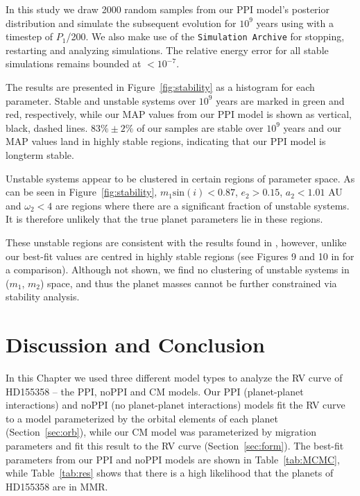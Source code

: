 In this study we draw 2000 random samples from our PPI model's posterior distribution and simulate the subsequent evolution for $10^9$ years using \whfast with a timestep of $P_1$/200. 
We also make use of the {\tt Simulation Archive} \citep{Rein2017} for stopping, restarting and analyzing simulations. 
The relative energy error for all stable simulations remains bounded at $< 10^{-7}$.

The results are presented in Figure~\ref{fig:stability} as a histogram for each parameter.
Stable and unstable systems over $10^9$ years are marked in green and red, respectively, while our MAP values from our PPI model is shown as vertical, black, dashed lines. 
$83\% \pm 2\%$ of our samples are stable over $10^9$ years and our MAP values land in highly stable regions, indicating that our PPI model is longterm stable. 

Unstable systems appear to be clustered in certain regions of parameter space.
As can be seen in Figure~\ref{fig:stability}, $m_1\textrm{sin}(i)<0.87$, $e_2>0.15$, $a_2<1.01$ AU and $\omega_2<4$ are regions where there are a significant fraction of unstable systems.
It is therefore unlikely that the true planet parameters lie in these regions. 

These unstable regions are consistent with the results found in \R, however, unlike \R our best-fit values are centred in highly stable regions (see Figures 9 and 10 in \R for a comparison). 
Although not shown, we find no clustering of unstable systems in ($m_1$, $m_2$) space, and thus the planet masses cannot be further constrained via stability analysis.  

\section{Discussion and Conclusion}
\label{sec:conc}
In this Chapter we used three different model types to analyze the RV curve of HD155358 -- the PPI, noPPI and CM models. 
Our PPI (planet-planet interactions) and noPPI (no planet-planet interactions) models fit the RV curve to a model parameterized by the orbital elements of each planet (Section~\ref{sec:orb}), while our CM model was parameterized by migration parameters and fit this result to the RV curve (Section~\ref{sec:form}).
The best-fit parameters from our PPI and noPPI models are shown in Table~\ref{tab:MCMC}, while Table~\ref{tab:res} shows that there is a high likelihood that the planets of HD155358 are in MMR. 

